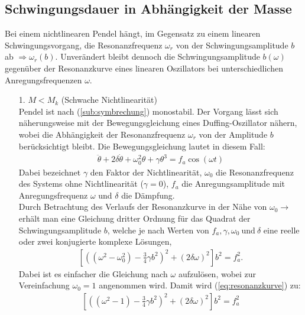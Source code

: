 \subsection{Schwingungsdauer in Abhängigkeit der Masse}
\label{sub:schwingungsdauer}
Bei einem nichtlinearen Pendel hängt, im Gegensatz zu einem linearen Schwingungsvorgang, die Resonanzfrequenz $\omega_r$ von der Schwingungsamplitude $b$ ab $\Rightarrow \omega_r(b)$. Unverändert bleibt dennoch die Schwingungsamplitude $b(\omega)$ gegenüber der Resonanzkurve eines linearen Oszillators bei unterschiedlichen Anregungsfrequenzen $\omega$. \citep{Lueck}
\begin{itemize}
    \item[1.] $M<M_k$ (Schwache Nichtlinearität)\\
    Pendel ist nach (\ref{sub:symbrechung}) monostabil. Der Vorgang lässt sich näherungsweise mit der Bewegungsgleichung eines Duffing-Oszillator nähern, wobei die Abhängigkeit der Resonanzfrequenz $\omega_r$ von der Amplitude $b$ berücksichtigt bleibt. Die Bewegungsgleichung lautet in diesem Fall:
    \begin{gather}
        \ddot{\theta} + 2\delta\dot{\theta} + \omega_0^2\theta + \gamma\theta^3 = f_a\cos(\omega t)
    \end{gather}
    Dabei bezeichnet $\gamma$ den Faktor der Nichtlinearität, $\omega_0$ die Resonanzfrequenz des Systems ohne Nichtlinearität ($\gamma=0$), $f_a$ die Anregungsamplitude mit Anregungsfrequenz $\omega$ und $\delta$ die Dämpfung.\\
    Durch Betrachtung des Verlaufs der Resonanzkurve in der Nähe von $\omega_0 \rightarrow$ erhält man eine Gleichung dritter Ordnung für das Quadrat der Schwingungsamplitude $b$, welche je nach Werten von $f_a, \gamma, \omega_0~\text{und}~\delta$ eine reelle oder zwei konjugierte komplexe Lösungen,
    \begin{gather}
        \left[\left((\omega^2-\omega_0^2) - \frac{3}{4}\gamma b^2\right)^2+(2\delta\omega)^2\right]b^2=f_a^2. %
        \label{eq:resonanzkurve}
    \end{gather}
    Dabei ist es einfacher die Gleichung nach $\omega$ aufzulösen, wobei zur Vereinfachung $\omega_0=1$ angenommen wird. Damit wird (\ref{eq:resonanzkurve}) zu:
    \begin{gather}
        \left[\left((\omega^2-1) - \frac{3}{4}\gamma b^2\right)^2+(2\delta\omega)^2\right]b^2=f_a^2
    \end{gather}

\end{itemize}
